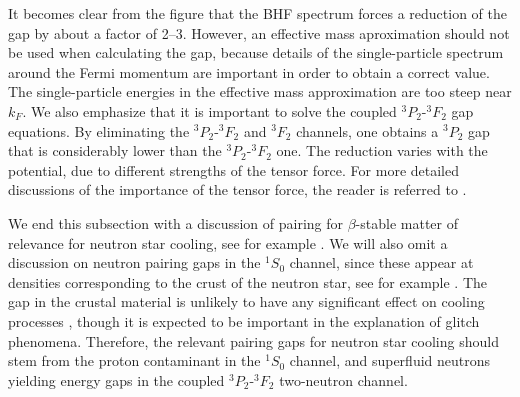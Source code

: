 \documentclass[rmp,preprint,aps,floatfix]{revtex4}
\begin{document}
It becomes clear from the figure that the BHF spectrum forces a 
reduction of the gap by about a factor of 2--3.
However, an effective mass aproximation should not be used when 
calculating the gap,  
because details of the single-particle spectrum around the Fermi 
momentum are important in order to obtain a correct value.   
The single-particle energies in the effective mass 
approximation are too steep near $k_F$.
We also emphasize that it is important to solve the coupled 
$^3P_2$-$^3F_2$ gap equations.  
By eliminating the $^3P_2$-$^3F_2$ and $^3F_2$ channels, 
one obtains a $^3P_2$ gap that is considerably lower than the 
$^3P_2$-$^3F_2$ one.  
The reduction varies with the potential,
due to different strengths of the tensor force.
For more detailed discussions of the importance of the tensor force, 
the reader is referred to \cite{amu85,taka93,elga96,kkc2001,kkc1998}.


We end this subsection
with a discussion of pairing for $\beta$-stable
matter of relevance for neutron star cooling, see for example 
 \cite{nstar,pethick1992}.
We will also omit a discussion on neutron pairing gaps in the
$^1S_0$ channel, since these appear at densities corresponding 
to the crust of the neutron star, see for example
\cite{barranco1997}. The gap in the crustal material 
is unlikely
to have any significant effect on cooling processes \cite{pr95}, 
though
it is expected to be important in the explanation 
of glitch phenomena.
Therefore, the relevant pairing gaps for neutron star cooling
should stem from 
the proton contaminant 
in the $^1S_0$ channel, and superfluid neutrons yielding energy gaps 
in the coupled $^3P_2$-$^3F_2$ two-neutron channel. 
\end{document}
